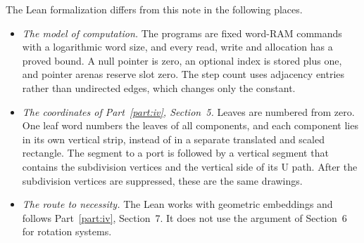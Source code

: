 \documentclass[11pt]{article}
\begin{document}
The Lean formalization differs from this note in the following places.
\begin{itemize}[nosep]
\item \emph{The model of computation.} The programs are fixed word-RAM
commands with a logarithmic word size, and every read, write and allocation
has a proved bound. A null pointer is zero, an optional index is stored plus
one, and pointer arenas reserve slot zero. The step count uses adjacency
entries rather than undirected edges, which changes only the constant.
\item \emph{The coordinates of Part~\ref{part:iv}, Section~5.} Leaves are
numbered from zero. One leaf word numbers the leaves of all components, and each
component lies in its own vertical strip, instead of in a separate translated
and scaled rectangle. The segment to a port is followed by a vertical segment
that contains the subdivision vertices and the vertical side of its U path.
After the subdivision vertices are suppressed, these are the same drawings.
\item \emph{The route to necessity.} The Lean works with geometric embeddings
and follows Part~\ref{part:iv}, Section~7. It does not use the argument of
Section~6 for rotation systems.
\end{itemize}
\end{document}
